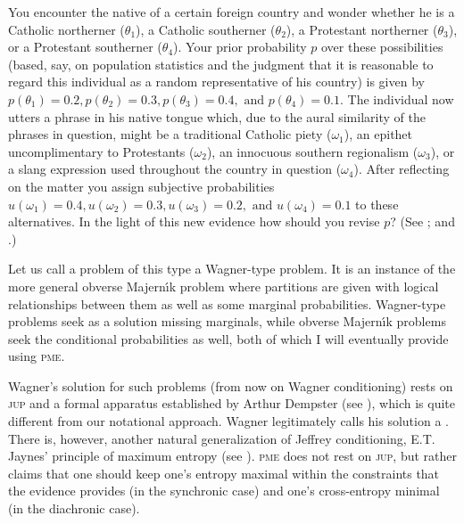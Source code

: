 \begin{quotex}
  You encounter the native of a certain foreign country and wonder
  whether he is a Catholic northerner ($\theta_{1}$), a Catholic
  southerner ($\theta_{2}$), a Protestant northerner ($\theta_{3}$),
  or a Protestant southerner ($\theta_{4}$). Your prior probability
  $p$ over these possibilities (based, say, on population statistics
  and the judgment that it is reasonable to regard this individual as
  a random representative of his country) is given by
  $p(\theta_{1})=0.2,p(\theta_{2})=0.3,p(\theta_{3})=0.4,\mbox{ and
  }p(\theta_{4})=0.1$. The individual now utters a phrase in his
  native tongue which, due to the aural similarity of the phrases in
  question, might be a traditional Catholic piety ($\omega_{1}$), an
  epithet uncomplimentary to Protestants ($\omega_{2}$), an innocuous
  southern regionalism ($\omega_{3}$), or a slang expression used
  throughout the country in question ($\omega_{4}$). After reflecting
  on the matter you assign subjective probabilities
  $u(\omega_{1})=0.4,u(\omega_{2})=0.3,u(\omega_{3})=0.2,\mbox{ and
  }u(\omega_{4})=0.1$ to these alternatives. In the light of this new
  evidence how should you revise $p$? (See ;
  and .)
\end{quotex}

Let us call a problem of this type a Wagner-type problem. It is an
instance of the more general obverse Majern{\'\i}k problem where partitions
are given with logical relationships between them as well as some
marginal probabilities. Wagner-type problems seek as a solution
missing marginals, while obverse Majern{\'\i}k problems seek the
conditional probabilities as well, both of which I will eventually
provide using \textsc{pme}.

Wagner's solution for such problems (from now on Wagner conditioning)
rests on \textsc{jup} and a formal apparatus established by Arthur
Dempster (see ), which is quite different from
our notational approach. Wagner legitimately calls his solution a
. There is, however, another natural
generalization of Jeffrey conditioning, E.T. Jaynes' principle of
maximum entropy (see ). \textsc{pme} does not rest on
\textsc{jup}, but rather claims that one should keep one's entropy
maximal within the constraints that the evidence provides (in the
synchronic case) and one's cross-entropy minimal (in the diachronic
case).

